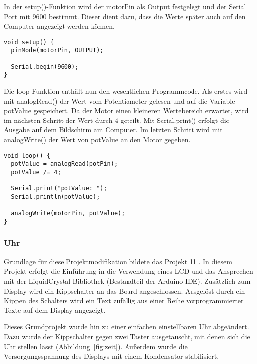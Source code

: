In der setup()-Funktion wird der motorPin als Output festgelegt und der Serial Port mit 9600 bestimmt. Dieser dient dazu, dass die Werte später auch auf den Computer angezeigt werden können.
\begin{lstlisting}[language=Arduino]
void setup() {
  pinMode(motorPin, OUTPUT);

  Serial.begin(9600);
}
\end{lstlisting}

Die loop-Funktion enthält nun den wesentlichen Programmcode. Als erstes wird mit analogRead() der Wert vom Potentiometer gelesen und auf die Variable potValue gespeichert. Da der Motor einen kleineren Wertebereich erwartet, wird im nächsten Schritt der Wert durch 4 geteilt. Mit Serial.print() erfolgt die Ausgabe auf dem Bildschirm am Computer. Im letzten Schritt wird mit analogWrite() der Wert von potValue an den Motor gegeben.
\begin{lstlisting}[language=Arduino]
void loop() {
  potValue = analogRead(potPin);
  potValue /= 4;

  Serial.print("potValue: ");
  Serial.println(potValue);

  analogWrite(motorPin, potValue);
}
\end{lstlisting}


\subsubsection{Uhr}
Grundlage für diese Projektmodifikation bildete das Projekt 11 \autocite{arduino}. In diesem Projekt erfolgt die Einführung in die Verwendung eines LCD und das Ansprechen mit der LiquidCrystal-Bibliothek (Bestandteil der Arduino IDE).
Zusätzlich zum Display wird ein Kippschalter an das Board angeschlossen. Ausgelöst durch ein Kippen des Schalters wird ein Text zufällig aus einer Reihe vorprogrammierter Texte auf dem Display angezeigt.

Dieses Grundprojekt wurde hin zu einer einfachen einstellbaren Uhr abgeändert. Dazu wurde der Kippschalter gegen zwei Taster ausgetauscht, mit denen sich die Uhr stellen lässt (Abbildung~\ref{fig:zeit}). Außerdem wurde die Versorgungsspannung des Displays mit einem Kondensator stabilisiert.


